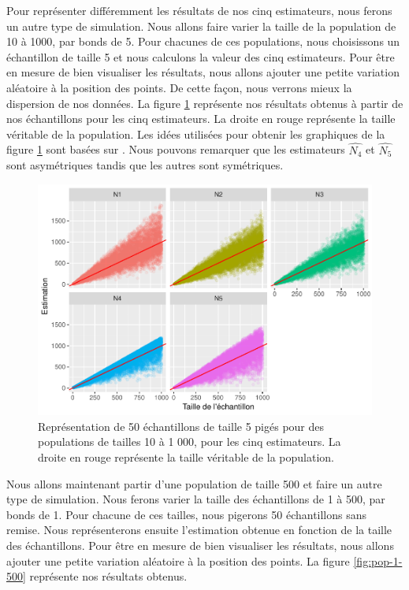 \documentclass[10pt]{article}
\begin{document}
Pour représenter différemment les résultats de nos cinq estimateurs,
nous ferons un autre type de simulation. Nous allons faire varier la
taille de la population de 10 à 1000, par bonds de 5. Pour chacunes de
ces populations, nous choisissons un échantillon de taille 5 et nous
calculons la valeur des cinq estimateurs. Pour être en mesure de bien
visualiser les résultats, nous allons ajouter une petite variation
aléatoire à la position des points. De cette façon, nous verrons mieux
la dispersion de nos données. La figure \ref{fig:ech-10-1000} représente
nos résultats obtenus à partir de nos échantillons pour les cinq
estimateurs. La droite en rouge représente la taille véritable de la
population. Les idées utilisées pour obtenir les graphiques de la figure
\ref{fig:ech-10-1000} sont basées sur \cite{Hinno}. Nous pouvons
remarquer que les estimateurs \(\widehat{N_4}\) et \(\widehat{N_5}\)
sont asymétriques tandis que les autres sont symétriques.

\begin{figure}[!htb]

{\centering \includegraphics[width=0.9\linewidth]{serial_number_amq_files/figure-latex/ech-10-1000-1} 

}

\caption{Représentation de 50 échantillons de taille 5 pigés pour des populations de tailles 10 à 1 000, pour les cinq estimateurs. La droite en rouge représente la taille véritable de la population.}\label{fig:ech-10-1000}
\end{figure}

Nous allons maintenant partir d'une population de taille 500 et faire un
autre type de simulation. Nous ferons varier la taille des échantillons
de 1 à 500, par bonds de 1. Pour chacune de ces tailles, nous pigerons
50 échantillons sans remise. Nous représenterons ensuite l'estimation
obtenue en fonction de la taille des échantillons. Pour être en mesure
de bien visualiser les résultats, nous allons ajouter une petite
variation aléatoire à la position des points. La figure
\ref{fig:pop-1-500} représente nos résultats obtenus.
\end{document}
